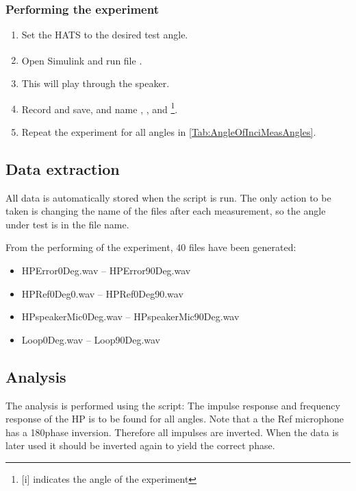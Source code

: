 \subsubsection{Performing the experiment}
\begin{enumerate}
	\item Set the HATS to the desired test angle. 
	\item Open Simulink\textsuperscript{\textregistered} and run file .
	\item This will play  through the speaker.
	\item Record and save, and name , ,  and \footnote{[i] indicates the angle of the experiment}.
	\item Repeat the experiment for all angles in \autoref{Tab:AngleOfInciMeasAngles}.
\end{enumerate}



\subsection{Data extraction}

All data is automatically stored when the script  is run. The only action to be taken is changing the name of the files after each measurement, so the angle under test is in the file name.


From the performing of the experiment, 40 files have been generated:
\begin{itemize}
	\item HPError0Deg.wav -- HPError90Deg.wav
	\item HPRef0Deg0.wav -- HPRef0Deg90.wav
	\item HPspeakerMic0Deg.wav -- 	HPspeakerMic90Deg.wav
	\item Loop0Deg.wav -- Loop90Deg.wav
\end{itemize}

\subsection{Analysis}
The analysis is performed using the script: 
The impulse response and frequency response of the HP is to be found for all angles.
Note that a the Ref microphone has a 180\textdegree phase inversion. Therefore all impulses are inverted. When the data is later used it should be inverted again to yield the correct phase. \cite{michandbook}

